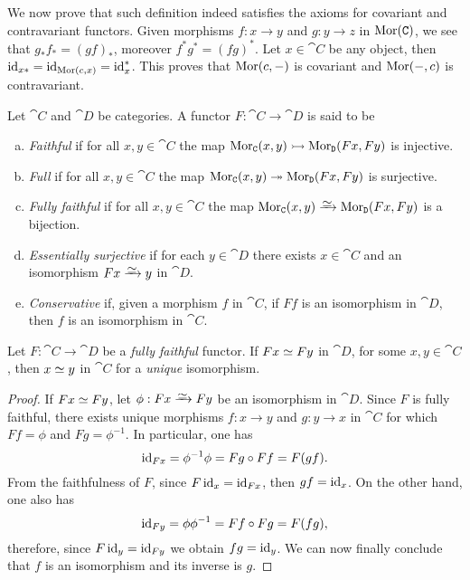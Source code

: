 We now prove that such definition indeed satisfies the axioms for covariant and
contravariant functors. Given morphisms \(f: x \to y\) and \(g: y \to z\) in
\(\operatorname{Mor}(\texttt C)\), we see that \(g_* f_* = (g f)_*\), moreover \(f^* g^* = (f
g)^*\). Let \(x \in \cat C\) be any object, then \(\operatorname{id}_{x *} = \operatorname{id}_{\operatorname{Mor}(c, x)}
= \operatorname{id}_x^*\). This proves that \(\operatorname{Mor}(c, -)\) is covariant and \(\operatorname{Mor}(-, c)\) is
contravariant.

\begin{definition}
    \label{def:faithful-full-fully-faithful-essentially-surjective-conservative}
    Let \(\cat C\) and \(\cat D\) be categories. A functor \(F: \cat C \to \cat D\)
    is said to be
    \begin{enumerate}[(a)]\setlength\itemsep{0em}
        \item \emph{Faithful} if for all \(x, y \in \cat C\) the map \(\operatorname{Mor}_{\texttt C}(x,
              y) \rightarrowtail \operatorname{Mor}_{\texttt D}(F x, F y)\) is injective.
        \item \emph{Full} if for all \(x, y \in \cat C\) the map \(\operatorname{Mor}_{\texttt C}(x, y)
              \twoheadrightarrow \operatorname{Mor}_{\texttt D}(F x, F y)\) is surjective.
        \item \emph{Fully faithful} if for all \(x, y \in \cat C\) the map \(\Hom_{\cat
                  C}(x, y) \isoto \Hom_{\cat D}(F x, F y)\) is a bijection.
        \item \emph{Essentially surjective} if for each \(y \in \cat D\) there exists
              \(x \in \cat C\) and an isomorphism \(F x \isoto y\) in \(\cat D\).
        \item \emph{Conservative} if, given a morphism \(f\) in \(\cat C\), if \(F f\)
              is an isomorphism in \(\cat D\), then \(f\) is an isomorphism in \(\cat C\).
    \end{enumerate}
\end{definition}

\begin{proposition}
    \label{prop:fully-faithful-image-iso-then-obj-iso}
    Let \(F: \cat C \to \cat D\) be a \emph{fully faithful} functor. If
    \(F x \simeq F y\) in \(\cat D\), for some \(x, y \in \cat C\), then \(x \simeq y\)
    in \(\cat C\) for a \emph{unique} isomorphism.
\end{proposition}

\begin{proof}
    If \(F x \simeq F y\), let \(\phi: F x \isoto F y\) be an isomorphism in
    \(\cat D\). Since \(F\) is fully faithful, there exists unique morphisms
    \(f: x \to y\) and \(g: y \to x\) in \(\cat C\) for which \(F f = \phi\) and
    \(F g = \phi^{-1}\). In particular, one has
    \[
        \operatorname{id}_{F x} =  \phi^{-1} \phi = F g \circ F f = F(g f).
    \]
    From the faithfulness of \(F\), since \(F \operatorname{id}_x = \operatorname{id}_{F x}\), then
    \(g f = \operatorname{id}_x\). On the other hand, one also has
    \[
        \operatorname{id}_{F y} = \phi \phi^{-1} = F f \circ F g = F(f g),
    \]
    therefore, since \(F \operatorname{id}_y = \operatorname{id}_{F y}\) we obtain \(f g = \operatorname{id}_y\). We can now
    finally conclude that \(f\) is an isomorphism and its inverse is \(g\).
\end{proof}

